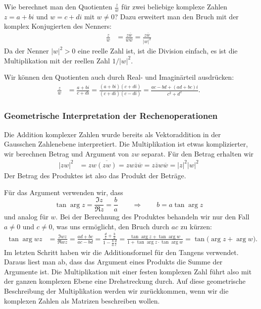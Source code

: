 Wie berechnet man den Quotienten $\frac{z}{w}$ für zwei beliebige komplexe
Zahlen $z=a+bi$ und $w=c+di$ mit $w\ne 0$?
Dazu erweitert man den Bruch mit der komplex Konjugierten des Nenners:
\begin{align*}
\frac{z}{w}
&=
\frac{z\overline{w}}{w\overline{w}}
=
\frac{z\overline{w}}{|w|^2}
\end{align*}
Da der Nenner $|w|^2>0$ eine reelle Zahl ist, ist die Division einfach,
es ist die Multiplikation mit der reellen Zahl $1/|w|^2$.

Wir können den Quotienten auch durch Real- und Imaginärteil ausdrücken:
\begin{align*}
\frac{z}{w}
&=
\frac{a+bi}{c+di}
=
\frac{(a+bi)(c+di)}{(c+di)(c-di)}
=
\frac{ac-bd +(ad+bc)i}{c^2+d^2}.
\end{align*}


\subsubsection{Geometrische Interpretation der Rechenoperationen}
Die Addition komplexer Zahlen wurde bereits als Vektoraddition
in der Gausschen Zahlenebene interpretiert. 
Die Multiplikation ist etwas komplizierter, wir berechnen Betrag
und Argument von $zw$ separat.
Für den Betrag erhalten wir
\begin{align*}
|zw|^2
&=
zw\overline{(zw)}
=
zw\overline{z}\overline{w}
=
z\overline{z}w\overline{w}
=
|z|^2|w|^2
\end{align*}
Der Betrag des Produktes ist also das Produkt der Beträge.

Für das Argument verwenden wir, dass
\[
\tan\operatorname{arg}z
=
\frac{\Im z}{\Re z}
=
\frac{b}{a}
\qquad\Rightarrow\qquad
b=a\tan\operatorname{arg}z
\]
und analog für $w$.
Bei der Berechnung des Produktes behandeln wir nur den Fall $a\ne 0$ 
und $c\ne 0$, was uns ermöglicht, den Bruch durch $ac$ zu kürzen:
\begin{align*}
\tan\arg wz
&=
\frac{\Im wz}{\Re wz}
=
\frac{ad+bc}{ac-bd}
=
\frac{\frac{d}{c} + \frac{b}{a}}{1-\frac{b}{a}\frac{d}{c}}
=
\frac{
\tan\operatorname{arg}z+\tan\operatorname{arg}w
}{
1+
\tan\operatorname{arg}z\cdot\tan\operatorname{arg}w
}
=
\tan\bigl(
\operatorname{arg}z+\operatorname{arg}w
\bigr).
\end{align*}
Im letzten Schritt haben wir die Additionsformel für den Tangens verwendet.
%
Daraus liest man ab, dass das Argument eines Produkts die Summe der
Argumente ist.
Die Multiplikation mit einer festen komplexen Zahl führt also mit der ganzen
komplexen Ebene eine Drehstreckung durch.
Auf diese geometrische Beschreibung der Multiplikation werden wir zurückkommen,
wenn wir die komplexen Zahlen als Matrizen beschreiben wollen.

